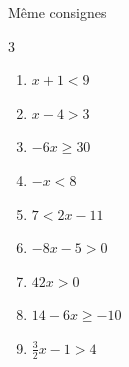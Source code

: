 \documentclass[main.tex]{subfiles}
\begin{document}
\begin{example}
{
}	
\end{example}
\begin{exercise}\label{chapter04:exercice:inequation01} Même consignes
	\vspace{-1em}
	\begin{multicols}{3}
		\begin{enumerate}[label={$(I_{\arabic*})$\rule{0pt}{1.7em}}, leftmargin=*]
			\item $x+1<9$
			\item $x-4>3$
			\item $-6x\geqslant 30$
			\item $-x<8$
			\item $7<2x-11$
			\item $-8x-5>0$
			\item $42x>0$
			\item $14-6x\geqslant -10$
			\item $\tfrac{3}{2}x-1>4$
		\end{enumerate}
	\end{multicols}  
\end{exercise}
 
\end{document}
